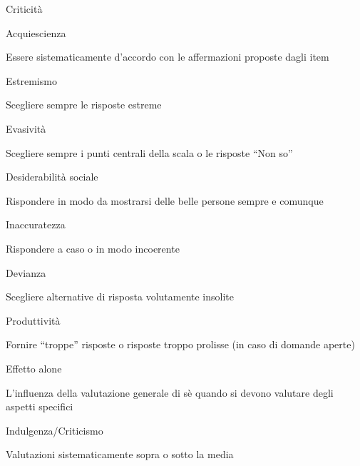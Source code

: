 \documentclass{beamer}
\begin{document}
\begin{frame}{Criticità}
	\begin{block}{Acquiescienza}
		
		Essere sistematicamente d'accordo con le affermazioni proposte dagli item
	\end{block}
	
	\begin{block}{Estremismo}
		
		Scegliere sempre le risposte estreme
	\end{block}
	
	\begin{block}{Evasività}
		
		Scegliere sempre i punti centrali della scala o le risposte ``Non so''
	\end{block}
	
	\begin{block}{Desiderabilità sociale}
		
		Rispondere in modo da mostrarsi delle belle persone sempre e comunque	
	\end{block}
	
\end{frame}



\begin{frame}
	\begin{block}{Inaccuratezza}
		
		Rispondere a caso o in modo incoerente
	\end{block}
	
	
	\begin{block}{Devianza}
		
		Scegliere alternative di risposta volutamente insolite
	\end{block}
	
	\begin{block}{Produttività}
		
		Fornire ``troppe'' risposte o risposte troppo prolisse (in caso di domande aperte)
	\end{block}
	
	\begin{block}{Effetto alone}
		
		L'influenza della valutazione generale di sè quando si devono valutare degli aspetti specifici
	\end{block}
	
	\begin{block}{Indulgenza/Criticismo}
		
		Valutazioni sistematicamente sopra o sotto la media
	\end{block}
\end{frame}
\end{document}
